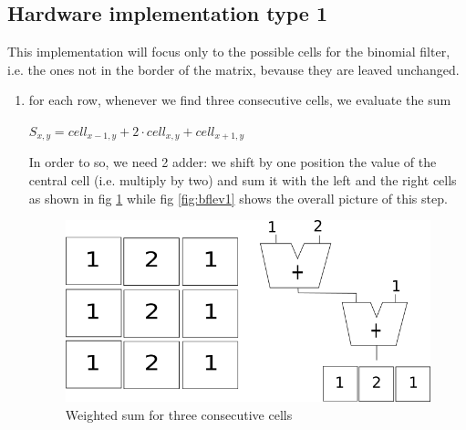         \subsection{Hardware implementation type 1} \label{h1}
        This implementation will focus only to the possible cells for the binomial filter, i.e. the ones not in the border of the matrix, bevause they are leaved unchanged.
        \begin{enumerate}
        	\item for each row, whenever we find three consecutive cells, we evaluate the sum \begin{center}
        		$ S_{x,y}=cell_{x-1,y}+2\cdot cell_{x,y}+cell_{x+1,y}$
        	\end{center}
        	In order to so, we need 2 adder: we shift by one position the value of the central cell (i.e. multiply by two) and sum it with the left and the right cells as shown in fig \ref{fig:bflev11} while fig \ref{fig:bflev1} shows the overall picture of this step.
        	\begin{figure}[h!]
        		\centering
        		\includegraphics[width=\textwidth]{imm/bf/bflev11.png}  
        		\caption{Weighted sum for three consecutive cells} 
        		\label{fig:bflev11}
        			\end{figure}
        			

\end{enumerate}
